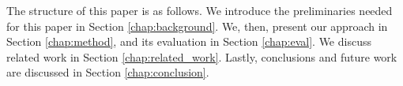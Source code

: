 
The structure of this paper is as follows. We introduce the preliminaries needed for this paper in Section \ref{chap:background}. We, then, present our approach in Section \ref{chap:method}, and its evaluation in Section \ref{chap:eval}. We discuss related work in Section \ref{chap:related_work}. Lastly, conclusions and future work are discussed in Section \ref{chap:conclusion}.

